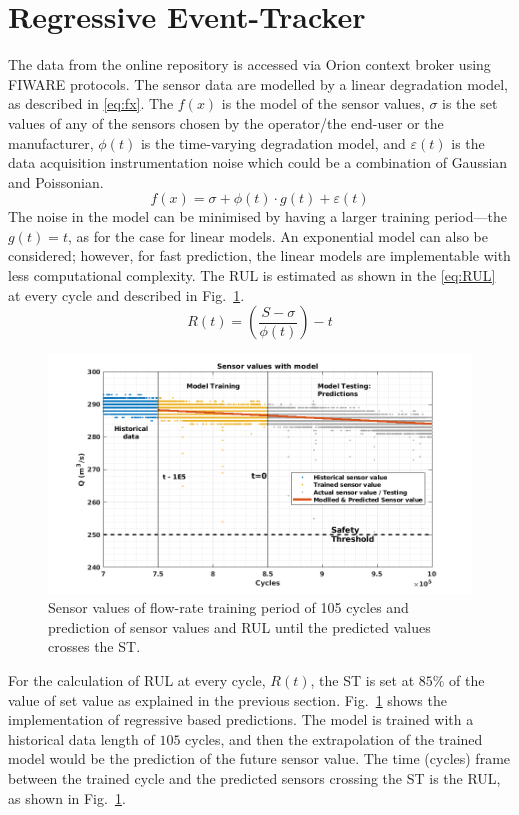 \documentclass[conference]{IEEEtran}
\begin{document}
\section{Regressive Event-Tracker}
\label{sec:RET}
The data from the online repository is accessed via Orion context broker using FIWARE protocols. The sensor data are modelled by a linear degradation model, as described in \eqref{eq:fx}. The $f(x)$ is the model of the sensor values, $\sigma$ is the set values of any of the sensors chosen by the operator/the end-user or the manufacturer, $\phi(t)$ is the time-varying degradation model, and $\varepsilon(t)$ is the data acquisition instrumentation noise which could be a combination of Gaussian and Poissonian.
\begin{equation}
    f(x) = \sigma + \phi(t)\cdot g(t) + \varepsilon(t)
    \label{eq:fx}
\end{equation}
The noise in the model can be minimised by having a larger training period—the $g(t)=t$, as for the case for linear models. An exponential model can also be considered; however, for fast prediction, the linear models are implementable with less computational complexity. The RUL is estimated as shown in the \eqref{eq:RUL} at every cycle and described in Fig.~\ref{fig:Model}.
\begin{equation}
    R(t) = \left(\frac{S-\sigma}{\phi(t)}\right)-t
    \label{eq:RUL}
\end{equation}
\begin{figure}[htbp]
\centerline{\includegraphics[width=\linewidth]{Model.png}}
\caption{Sensor values of flow-rate training period of 105 cycles and prediction of sensor values and RUL until the predicted values crosses the ST.}
\label{fig:Model}
\end{figure}
For the calculation of RUL at every cycle, $R(t)$, the ST is set at $85\%$ of the value of set value as explained in the previous section. Fig.~\ref{fig:Model} shows the implementation of regressive based predictions. The model is trained with a historical data length of $105$ cycles, and then the extrapolation of the trained model would be the prediction of the future sensor value. The time (cycles) frame between the trained cycle and the predicted sensors crossing the ST is the RUL, as shown in Fig.~\ref{fig:Model}.
\end{document}
